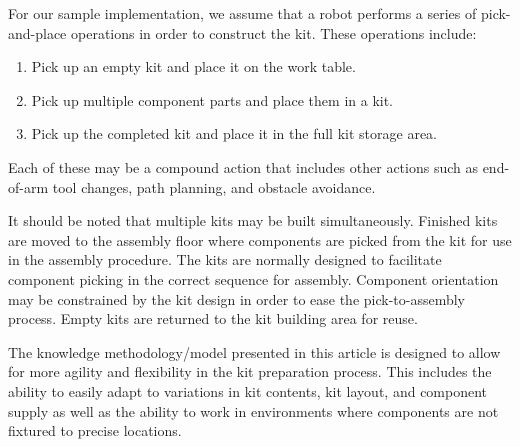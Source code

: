 For our sample implementation, we assume that
a robot performs a series of pick-and-place operations
in order to construct the kit. These operations include:
\begin{enumerate}
\item Pick up an empty kit and place it on the work table.
\item Pick up multiple component parts and place them in a kit.
\item Pick up the completed kit and place it in the full kit storage area.
\end{enumerate}
Each of these may be a compound action that includes
other actions such as end-of-arm tool changes, path planning,
and obstacle avoidance.

It should be noted that multiple kits may be built simultaneously.
Finished kits are moved to the assembly floor where components
are picked from the kit for use in the assembly procedure.
The kits are normally designed to facilitate component picking in the correct
sequence for assembly. Component orientation may be constrained
by the kit design in order to ease the pick-to-assembly process.
Empty kits are returned to the kit building area for reuse.

The knowledge methodology/model presented in this article is
designed to allow for more agility and flexibility in the
kit preparation process. This includes the ability to easily
adapt to variations in kit contents, kit
layout, and component supply as well as the ability to work in
environments where components are not fixtured to precise locations.
